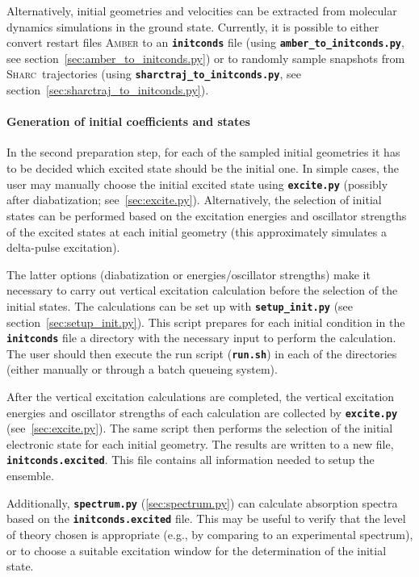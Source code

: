 \documentclass[a4paper,10pt,DIV=15,openany,twoside=false]{scrbook}
\newcommand{\sharc}{\textsc{Sharc}}
\newcommand{\ttt}[1]{\textbf{\texttt{#1}}}
\begin{document}
Alternatively, initial geometries and velocities can be extracted from molecular dynamics simulations in the ground state.
Currently, it is possible to either convert restart files \textsc{Amber} to an \ttt{initconds} file (using \ttt{amber\_to\_initconds.py}, see section~\ref{sec:amber_to_initconds.py}) or to randomly sample snapshots from \sharc\ trajectories (using \ttt{sharctraj\_to\_initconds.py}, see section~\ref{sec:sharctraj_to_initconds.py}).

\paragraph{Generation of initial coefficients and states}

In the second preparation step, for each of the sampled initial geometries it has to be decided which excited state should be the initial one. In simple cases, the user may manually choose the initial excited state using \ttt{excite.py} (possibly after diabatization; see~\ref{sec:excite.py}). Alternatively, the selection of initial states can be performed based on the excitation energies and oscillator strengths of the excited states at each initial geometry (this approximately simulates a delta-pulse excitation). 

The latter options (diabatization or energies/oscillator strengths) make it necessary to carry out vertical excitation calculation before the selection of the initial states.
The calculations can be set up with \ttt{setup\_init.py} (see section~\ref{sec:setup_init.py}). This script prepares for each initial condition in the \ttt{initconds} file a directory with the necessary input to perform the calculation. The user should then execute the run script (\ttt{run.sh}) in each of the directories (either manually or through a batch queueing system).

After the vertical excitation calculations are completed, the vertical excitation energies and oscillator strengths of each calculation are collected by \ttt{excite.py} (see~\ref{sec:excite.py}). The same script then performs the selection of the initial electronic state for each initial geometry. The results are written to a new file, \ttt{initconds.excited}. This file contains all information needed to setup the ensemble. 

Additionally, \ttt{spectrum.py} (\ref{sec:spectrum.py}) can calculate absorption spectra based on the \ttt{initconds.excited} file. This may be useful to verify that the level of theory chosen is appropriate (e.g., by comparing to an experimental spectrum), or to choose a suitable excitation window for the determination of the initial state.
\end{document}
